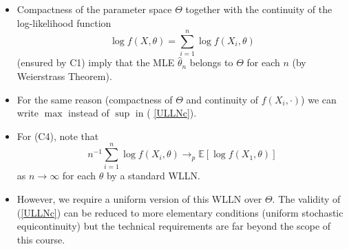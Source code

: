 \documentclass[notes=show]{beamer}
\begin{document}
\begin{frame}%


\begin{itemize}
\item Compactness of the parameter space $\Theta $ together with the
continuity of the log-likelihood function%
\begin{equation}
\log f\left( X,\theta \right) =\sum_{i=1}^{n}\log f\left( X_{i},\theta
\right)  \label{lL}
\end{equation}%
(ensured by C1) imply that the MLE $\hat{\theta}_{n}$ belongs to $\Theta $
for each $n$ (by Weierstrass Theorem).

\item For the same reason (compactness of $\Theta $ and continuity of $%
f\left( X_{i},\cdot \right) $) we can write $\max $ instead of $\sup $ in (%
\ref{ULLNc}).
\end{itemize}

\end{frame}%

\begin{frame}%


\begin{itemize}
\item For (C4), note that 
\begin{equation*}
n^{-1}\sum_{i=1}^{n}\log f\left( X_{i},\theta \right) \rightarrow _{p}%
\mathbb{E}\left[ \log f\left( X_{1},\theta \right) \right]
\end{equation*}%
as $n\rightarrow \infty $ for each $\theta $ by a standard WLLN.

\item However, we require a uniform version of this WLLN over $\Theta .$ The
validity of (\ref{ULLNc}) can be reduced to more elementary conditions
(uniform stochastic equicontinuity) but the technical requirements are far
beyond the scope of this course.
\end{itemize}

\end{frame}%
\end{document}

